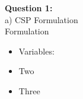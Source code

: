 \documentclass[10pt]{article}
\begin{document}
{\bf Question 1:}\\
a) CSP Formulation\\
Formulation\\
\begin{itemize}
	\item Variables: 
	\item Two
	\item Three
\end{itemize}
\end{document}
